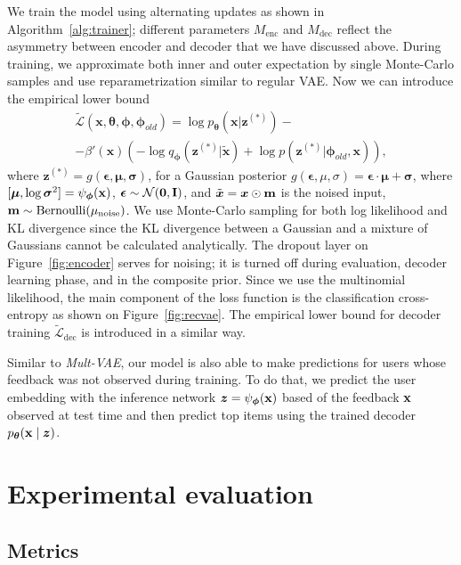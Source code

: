\documentclass[sigconf,authorversion]{acmart}
\def\x{{\bf x}}
\def\bZero{{\bf 0}}
\def\bm{{\bf m}}
\def\bz{{\bf z}}
\def\bI{{\bf I}}
\def\N{{\mathcal N}}
\def\dec{\mathrm{dec}}
\def\enc{\mathrm{enc}}
\def\btheta{{\boldsymbol{\theta}}}
\def\bmu{{\boldsymbol{\mu}}}
\def\bsigma{{\boldsymbol{\sigma}}}
\def\bphi{{\boldsymbol{\phi}}}
\def\beps{{\boldsymbol{\epsilon}}}
\def\bz{\boldsymbol{z}}
\def\bx{\boldsymbol{x}}
\begin{document}
We train the model using alternating updates as shown in Algorithm~\ref{alg:trainer}; different parameters $M_{\enc}$ and $M_{\dec}$ reflect the asymmetry between encoder and decoder that we have discussed above. During training, we approximate both inner and outer expectation by single Monte-Carlo samples and use reparametrization similar to regular VAE.
Now we can introduce the empirical lower bound 
\begin{multline}\label{eq:elbo_emp}
    \widetilde{\mathcal{L}}(\bx, \btheta, \bphi, \bphi_{old}) = 
    \log p_{\btheta}(\bx|\bz^{(*)}) -  \\
      - \beta'(\bx)
     \left(- \log q_{\bphi}\left(\bz^{(*)}|\tilde{\bx}\right) + \log p\left(\bz^{(*)}| \bphi_{old}, \bx\right)\right),
\end{multline}
where $\bz^{(*)} = g(\beps, \bmu, \bsigma)$, for a Gaussian posterior $g(\beps, \mu, \sigma) = \beps \cdot \bmu + \bsigma$, where $[\bmu, \log \bsigma^2]=\psi_{\bphi}(\x)$, $\beps \sim \N(\bZero,\bI)$, and $\tilde{\bx} = \bx \odot \bm$ is the noised input, $\bm \sim \mathrm{Bernoulli}(\mu_{\mathrm{noise}})$. We use Monte-Carlo sampling for both log likelihood and KL divergence since the KL divergence between a Gaussian and a mixture of Gaussians cannot be calculated analytically. The dropout layer on Figure~\ref{fig:encoder} serves for noising; it is turned off during evaluation, decoder learning phase, and in the composite prior. Since we use the multinomial likelihood, the main component of the loss function is the classification cross-entropy as shown on Figure~\ref{fig:recvae}. The empirical lower bound for decoder training $\widetilde{\mathcal{L}}_{\dec}$ is introduced in a similar way.

Similar to \emph{Mult-VAE}, our model is also able to make predictions for users whose feedback was not observed during training. To do that, we predict the user embedding with the inference network $\bz=\psi_{\bphi}(\x)$ based of the feedback $\x$ observed at test time and then predict top items using the trained decoder $p_{\btheta}(\x\mid\bz)$.

\section{Experimental evaluation}\label{sec:experiments}

\subsection{Metrics}
\end{document}
